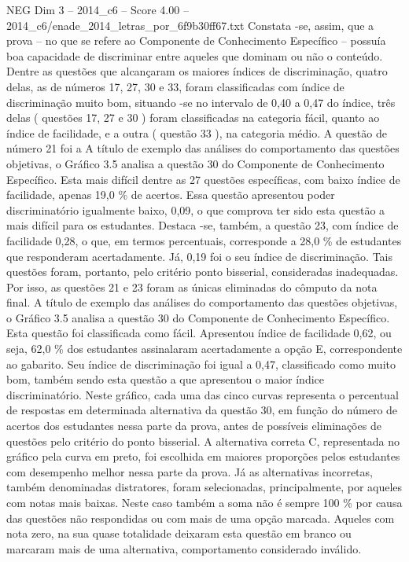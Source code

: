 \begin{textsample}{NEG Dim 3 – 2014\_c6 – Score 4.00 – 2014\_c6/enade\_2014\_letras\_por\_6f9b30ff67.txt}
Constata -se, assim, que a prova – no que se refere ao Componente de Conhecimento Específico – possuía boa capacidade de discriminar entre aqueles que dominam ou não o conteúdo.
Dentre as questões que alcançaram os maiores índices de discriminação, quatro delas, as de números 17, 27, 30 e 33, foram classificadas com índice de discriminação muito bom, situando -se no intervalo de 0,40 a 0,47 do índice, três delas ( questões 17, 27 e 30 ) foram classificadas na categoria fácil, quanto ao índice de facilidade, e a outra ( questão 33 ), na categoria médio.
A questão de número 21 foi a A título de exemplo das análises do comportamento das questões objetivas, o Gráfico 3.5 analisa a questão 30 do Componente de Conhecimento Específico.
Esta mais difícil dentre as 27 questões específicas, com baixo índice de facilidade, apenas 19,0 \% de acertos.
Essa questão apresentou poder discriminatório igualmente baixo, 0,09, o que comprova ter sido esta questão a mais difícil para os estudantes.
Destaca -se, também, a questão 23, com índice de facilidade 0,28, o que, em termos percentuais, corresponde a 28,0 \% de estudantes que responderam acertadamente.
Já, 0,19 foi o seu índice de discriminação.
Tais questões foram, portanto, pelo critério ponto bisserial, consideradas inadequadas.
Por isso, as questões 21 e 23 foram as únicas eliminadas do cômputo da nota final.
A título de exemplo das análises do comportamento das questões objetivas, o Gráfico 3.5 analisa a questão 30 do Componente de Conhecimento Específico.
Esta questão foi classificada como fácil.
Apresentou índice de facilidade 0,62, ou seja, 62,0 \% dos estudantes assinalaram acertadamente a opção E, correspondente ao gabarito.
Seu índice de discriminação foi igual a 0,47, classificado como muito bom, também sendo esta questão a que apresentou o maior índice discriminatório.
Neste gráfico, cada uma das cinco curvas representa o percentual de respostas em determinada alternativa da questão 30, em função do número de acertos dos estudantes nessa parte da prova, antes de possíveis eliminações de questões pelo critério do ponto bisserial.
A alternativa correta C, representada no gráfico pela curva em preto, foi escolhida em maiores proporções pelos estudantes com desempenho melhor nessa parte da prova.
Já as alternativas incorretas, também denominadas distratores, foram selecionadas, principalmente, por aqueles com notas mais baixas.
Neste caso também a soma não é sempre 100 \% por causa das questões não respondidas ou com mais de uma opção marcada.
Aqueles com nota zero, na sua quase totalidade deixaram esta questão em branco ou marcaram mais de uma alternativa, comportamento considerado inválido.

\end{textsample}
